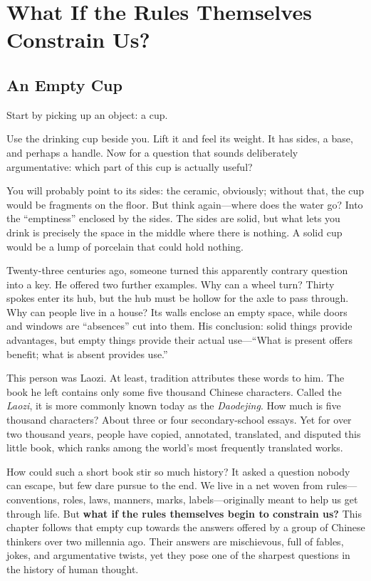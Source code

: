 \chapter[When Rules Constrain Us]{What If the Rules Themselves Constrain Us?}
\section{An Empty Cup}
Start by picking up an object: a cup.

Use the drinking cup beside you. Lift it and feel its weight. It has sides, a base, and perhaps a handle. Now for a question that sounds deliberately argumentative: which part of this cup is actually useful?

You will probably point to its sides: the ceramic, obviously; without that, the cup would be fragments on the floor. But think again---where does the water go? Into the ``emptiness'' enclosed by the sides. The sides are solid, but what lets you drink is precisely the space in the middle where there is nothing. A solid cup would be a lump of porcelain that could hold nothing.

Twenty-three centuries ago, someone turned this apparently contrary question into a key. He offered two further examples. Why can a wheel turn? Thirty spokes enter its hub, but the hub must be hollow for the axle to pass through. Why can people live in a house? Its walls enclose an empty space, while doors and windows are ``absences'' cut into them. His conclusion: solid things provide advantages, but empty things provide their actual use---``What is present offers benefit; what is absent provides use.''

This person was Laozi. At least, tradition attributes these words to him. The book he left contains only some five thousand Chinese characters. Called the \textit{Laozi}, it is more commonly known today as the \textit{Daodejing}. How much is five thousand characters? About three or four secondary-school essays. Yet for over two thousand years, people have copied, annotated, translated, and disputed this little book, which ranks among the world's most frequently translated works.

How could such a short book stir so much history? It asked a question nobody can escape, but few dare pursue to the end. We live in a net woven from rules---conventions, roles, laws, manners, marks, labels---originally meant to help us get through life. But \textbf{what if the rules themselves begin to constrain us?} This chapter follows that empty cup towards the answers offered by a group of Chinese thinkers over two millennia ago. Their answers are mischievous, full of fables, jokes, and argumentative twists, yet they pose one of the sharpest questions in the history of human thought.

